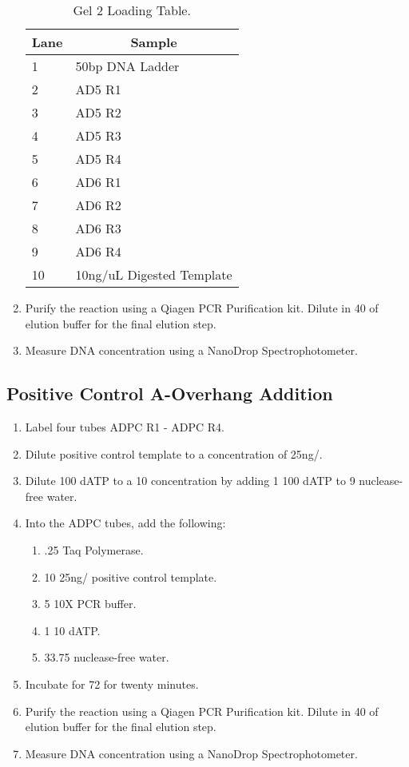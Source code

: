 \documentclass{ssiBio}
\begin{document}
\begin{enumerate}
\begin{table}[ht]
  \centering
  \begin{tabular}{|l|l|}
  \hline
  \multicolumn{1}{|c|}{\textbf{Lane}} & \multicolumn{1}{c|}{\textbf{Sample}} \\ \hline
  1 & 50bp DNA Ladder \\ \hline
  2 & AD5 R1 \\ \hline
  3 & AD5 R2 \\ \hline
  4 & AD5 R3 \\ \hline
  5 & AD5 R4 \\ \hline
  6 & AD6 R1 \\ \hline
  7 & AD6 R2 \\ \hline
  8 & AD6 R3 \\ \hline
  9 & AD6 R4 \\ \hline
  10 & 10ng/uL Digested Template \\ \hline
  \end{tabular}
  \caption{\label{tab:gel-2-table}Gel 2 Loading Table.}
  \end{table}
\stopPoint{}
\item{Purify the reaction using a Qiagen PCR Purification kit. Dilute in 40 \uL{} of elution buffer for the final elution step.}
\item{Measure DNA concentration using a NanoDrop Spectrophotometer.}
\stopPoint{}
\end{enumerate}

\subsection{Positive Control A-Overhang Addition}
\begin{enumerate}
\item{Label four tubes ADPC R1 - ADPC R4.}
\item{Dilute positive control template to a concentration of 25ng/\uL{}.}
\item{Dilute 100\uM{} dATP to a 10\uM{} concentration by adding 1\uL{} 100\uM{} dATP to 9\uL{} nuclease-free water.}
\item{Into the ADPC tubes, add the following:}
\begin{enumerate}
  \item{.25\uL{} Taq Polymerase.}
  \item{10\uL{} 25ng/\uL{} positive control template.}
  \item{5\uL{} 10X PCR buffer.}
  \item{1\uL{} 10\uM{} dATP.}
  \item{33.75\uL{} nuclease-free water.}
\end{enumerate}
\item{Incubate for 72\C{} for twenty minutes.}
\stopPoint{}
\item{Purify the reaction using a Qiagen PCR Purification kit. Dilute in 40 \uL{} of elution buffer for the final elution step.}
\item{Measure DNA concentration using a NanoDrop Spectrophotometer.}
\end{enumerate}
\stopPoint{}
\end{document}
